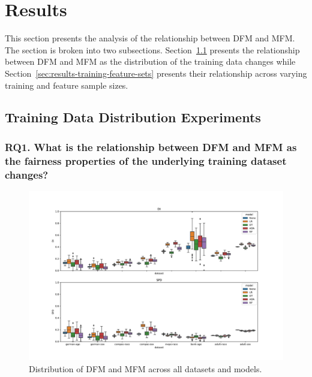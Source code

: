 \documentclass[sigconf,review,anonymous]{acmart}
\begin{document}
\section{Results}\label{sec:results}

This section presents the analysis of the relationship between DFM and
MFM. The section is broken into two
subsections. Section \ref{sec:results-full} presents the relationship
between DFM and MFM as the distribution of the training data changes
while Section \ref{sec:results-training-feature-sets} presents their
relationship across varying training and feature sample sizes.

\subsection{Training Data Distribution Experiments}\label{sec:results-full}
\subsubsection{RQ1. What is the relationship between DFM and MFM as
the fairness properties of the underlying training dataset changes?}\label{sec:results-full-rel}

\begin{figure}
  \centering
  \includegraphics[width=\linewidth]{boxplot--dataset--di-spd--exp-full.pdf}
  \caption{Distribution of DFM and MFM across all datasets and models.}
  \label{fig:boxplot--dataset--di-spd--exp-full}
\end{figure}
\end{document}
